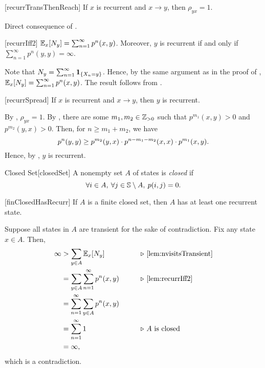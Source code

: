 \documentclass[../probability.tex]{subfiles}
\begin{document}
\begin{Lemma}{}[recurrTransThenReach]
    If \(x\) is recurrent and \(x \to y\), then \(\rho_{yx} = 1\).
\end{Lemma}
\begin{myproof}[Proof]
    Direct consequence of .
\end{myproof}

\begin{Lemma}{}[recurrIff2]
    \(\mathbb{E}_x[N_y] = \sum_{n=1}^\infty p^n(x, y)\).
    Moreover, \(y\) is recurrent if and only if \(\sum_{n=1}^\infty p^n(y,y) = \infty\).
\end{Lemma}
\begin{myproof}[Proof]
    Note that \(N_y = \sum_{n=1}^\infty \bm{\mathrm{1}}_{\{X_n = y\}}\).
    Hence, by the same argument as in the proof of ,
    \(\mathbb{E}_x[N_y] = \sum_{n=1}^\infty p^n(x, y)\).
    The result follows from .
\end{myproof}

\begin{Lemma}{}[recurrSpread]
    If \(x\) is recurrent and \(x \to y\), then \(y\) is recurrent.
\end{Lemma}
\begin{myproof}[Proof]
    By , \(\rho_{yx} = 1\).
    By , there are some \(m_1, m_2 \in \ZZ_{>0}\)
    such that \(p^{m_1}(x, y) > 0\) and \(p^{m_2}(y, x) > 0\).
    Then, for \(n \ge m_1 + m_2\), we have
    \[
        p^{n}(y, y) \ge p^{m_2}(y, x) \cdot p^{n-m_1-m_2}(x, x) \cdot p^{m_1}(x, y)\text.
    \]
    Hence, by , \(y\) is recurrent.
\end{myproof}

\begin{Definition}{Closed Set}[closedSet]
    A nonempty set \(A\) of states is \emph{closed} if
    \[
        \forall i \in A,\: \forall j \in \mathbb{S} \setminus A,\:
        p(i, j) = 0\text.
    \]
\end{Definition}

\begin{Lemma}{}[finClosedHasRecurr]
    If \(A\) is a finite closed set,
    then \(A\) has at least one recurrent state.
\end{Lemma}
\begin{myproof}[Proof]
    Suppose all states in \(A\) are transient for the sake of contradiction.
    Fix any state \(x \in A\).
    Then,
    \begin{alignat*}{2}
        \infty
        &> \sum_{y \in A} \mbb{E}_x[N_y]
        &\qquad& \comment{\Cref{lem:nvisitsTransient}} \\
        &= \sum_{y \in A} \sum_{n = 1}^\infty p^n(x, y)
        && \comment{\Cref{lem:recurrIff2}} \\
        &= \sum_{n=1}^\infty \sum_{y \in A} p^n(x, y) \\
        &= \sum_{n=1}^\infty 1
        && \comment{\(A\) is closed} \\
        &= \infty\text,
    \end{alignat*}
    which is a contradiction.
\end{myproof}
\end{document}
